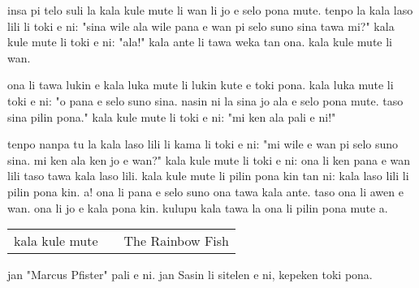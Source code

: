 insa pi telo suli la kala kule mute li wan li jo e selo pona mute.
tenpo la kala laso lili li toki e ni: "sina wile ala wile pana e wan pi selo suno sina tawa mi?"
kala kule mute li toki e ni: "ala!"
kala ante li tawa weka tan ona. kala kule mute li wan.

ona li tawa lukin e kala luka mute li lukin kute e toki pona.
kala luka mute li toki e ni: "o pana e selo suno sina. nasin ni la sina jo ala e selo pona mute. taso sina pilin pona."
kala kule mute li toki e ni: "mi ken ala pali e ni!"

tenpo nanpa tu la kala laso lili li kama li toki e ni: "mi wile e wan pi selo suno sina. mi ken ala ken jo e wan?"
kala kule mute li toki e ni: ona li ken pana e wan lili taso tawa kala laso lili.
kala kule mute li pilin pona kin tan ni: kala laso lili li pilin pona kin. a!
ona li pana e selo suno ona tawa kala ante. taso ona li awen e wan.
ona li jo e kala pona kin.
kulupu kala tawa la ona li pilin pona mute a.

\begin{supertabular}{p{5,5cm}|ll}
kala kule mute && The Rainbow Fish \\
\end{supertabular}

jan "Marcus Pfister" pali e ni. jan Sasin li sitelen e ni, kepeken toki pona.
